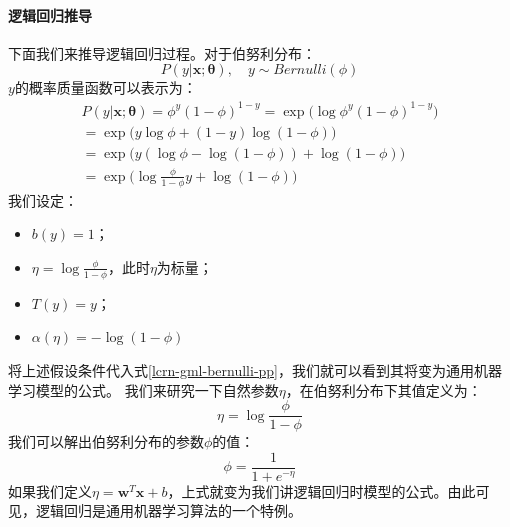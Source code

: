 \documentclass[UTF8]{article}
\begin{document}
\paragraph{逻辑回归推导}
下面我们来推导逻辑回归过程。对于伯努利分布：
\begin{equation}
P(y \vert \boldsymbol{x}; \boldsymbol{\theta}), \quad y \sim Bernulli(\phi)
\label{lcrn-gml-bernulli}
\end{equation}
$y$的概率质量函数可以表示为：
\begin{equation}
\begin{aligned}
P(y \vert \boldsymbol{x}; \boldsymbol{\theta}) = \phi ^{y} (1-\phi)^{1-y} = \exp \Big( \log \phi ^{y} (1-\phi)^{1-y}  \Big) \\
=\exp \Big( y\log \phi + (1-y)\log (1-\phi) \Big) \\
= \exp \Big( y(\log \phi - \log (1-\phi)) + \log(1-\phi)\Big) \\
= \exp \Big( \log \frac{\phi}{1-\phi} y + \log (1-\phi) \Big)
\end{aligned}
\label{lcrn-gml-bernulli-pp}
\end{equation}
我们设定：
\begin{itemize}
\item $b(y)=1$；
\item $\eta = \log \frac{\phi}{1-\phi}$，此时$\eta$为标量；
\item $T(y)=y$；
\item $\alpha(\eta)=-\log(1-\phi)$
\end{itemize}
将上述假设条件代入式\ref{lcrn-gml-bernulli-pp}，我们就可以看到其将变为通用机器学习模型的公式。\newline
我们来研究一下自然参数$\eta$，在伯努利分布下其值定义为：
\begin{equation}
\eta = \log \frac{\phi}{1-\phi}
\label{lcrn-gml-eta-def}
\end{equation}
我们可以解出伯努利分布的参数$\phi$的值：
\begin{equation}
\phi = \frac{1}{1+e^{-\eta}}
\label{lcrn-gml-eta-to-phi}
\end{equation}
如果我们定义$\eta=\boldsymbol{w}^{T}\boldsymbol{x} + b$，上式就变为我们讲逻辑回归时模型的公式。由此可见，逻辑回归是通用机器学习算法的一个特例。
\end{document}
